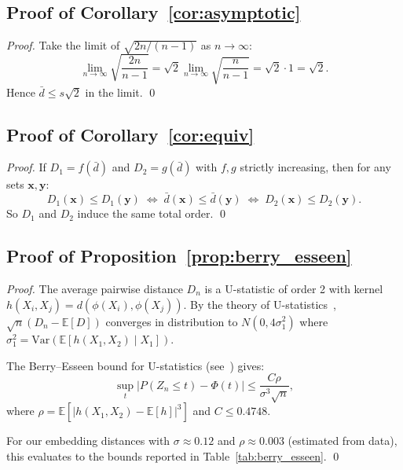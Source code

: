 \documentclass[11pt,a4paper]{article}
\newcommand{\E}{\mathbb{E}}
\newcommand{\Var}{\mathrm{Var}}
\begin{document}
\subsection{Proof of Corollary~\ref{cor:asymptotic}}

\begin{proof}
Take the limit of $\sqrt{2n/(n-1)}$ as $n \to \infty$:
\begin{equation}
  \lim_{n\to\infty} \sqrt{\frac{2n}{n-1}}
  = \sqrt{2} \lim_{n\to\infty} \sqrt{\frac{n}{n-1}}
  = \sqrt{2} \cdot 1 = \sqrt{2}.
\end{equation}
Hence $\bar{d} \leq s\sqrt{2}$ in the limit. \qed
\end{proof}

\subsection{Proof of Corollary~\ref{cor:equiv}}

\begin{proof}
If $D_1 = f(\bar{d})$ and $D_2 = g(\bar{d})$ with
$f, g$ strictly increasing, then for any sets
$\mathbf{x}, \mathbf{y}$:
\begin{equation}
  D_1(\mathbf{x}) \leq D_1(\mathbf{y})
  \;\Leftrightarrow\;
  \bar{d}(\mathbf{x}) \leq \bar{d}(\mathbf{y})
  \;\Leftrightarrow\;
  D_2(\mathbf{x}) \leq D_2(\mathbf{y}).
\end{equation}
So $D_1$ and $D_2$ induce the same total order. \qed
\end{proof}

\subsection{Proof of Proposition~\ref{prop:berry_esseen}}

\begin{proof}
The average pairwise distance $D_n$ is a U-statistic of
order 2 with kernel $h(X_i, X_j) = d(\phi(X_i), \phi(X_j))$.
By the theory of U-statistics~\citep{serfling1980approximation},
$\sqrt{n}(D_n - \E[D])$ converges in distribution to
$N(0, 4\sigma_1^2)$ where $\sigma_1^2 = \Var(\E[h(X_1, X_2)
\mid X_1])$.

The Berry--Esseen bound for U-statistics
(see~\citealt{callaert1978berry}) gives:
\begin{equation}
  \sup_t |P(Z_n \leq t) - \Phi(t)|
  \leq \frac{C\rho}{\sigma^3\sqrt{n}},
\end{equation}
where $\rho = \E[|h(X_1,X_2) - \E[h]|^3]$ and
$C \leq 0.4748$.

For our embedding distances with $\sigma \approx 0.12$
and $\rho \approx 0.003$ (estimated from data), this
evaluates to the bounds reported in
Table~\ref{tab:berry_esseen}. \qed
\end{proof}
\end{document}
